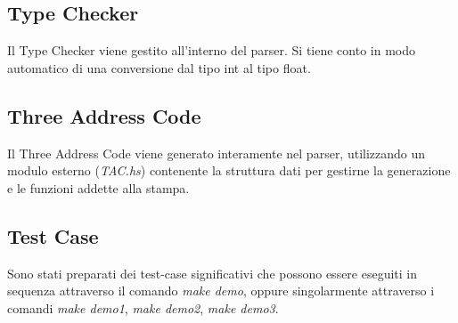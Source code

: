 \documentclass[12pt]{article}
\begin{document}
\subsection*{Type Checker}
Il Type Checker viene gestito all'interno del parser. Si tiene conto in modo automatico di una conversione dal tipo int al tipo float.

\subsection*{Three Address Code}
Il Three Address Code viene generato interamente nel parser, utilizzando un modulo esterno (\textit{TAC.hs}) contenente la struttura dati per gestirne la generazione e le funzioni addette alla stampa.

\subsection*{Test Case}
Sono stati preparati dei test-case significativi che possono essere eseguiti in sequenza attraverso il comando \textit{make demo}, oppure singolarmente attraverso i comandi \textit{make demo1}, \textit{make demo2}, \textit{make demo3}.
\end{document}
